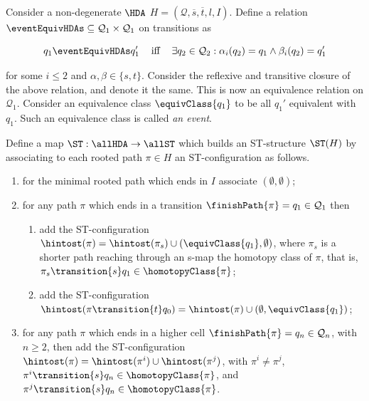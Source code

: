     \begin{definition}
        \label{def:HDA-to-ST-structure}
        Consider a non-degenerate $\HDA$ $H=(\mathcal{Q},\overline{s},\overline{t},l,I)$. Define a relation $\eventEquivHDAs\subseteq \mathcal{Q}_{1}\times \mathcal{Q}_{1}$ on transitions as 
    
        \[
            q_{1}\eventEquivHDAs q_{1}' \mbox{\hspace{2ex} iff \hspace{2ex}} \exists q_{2}\in \mathcal{Q}_{2}:\alpha_{i}(q_{2})=q_{1}\wedge \beta_{i}(q_{2})=q_{1}'
        \]

        for some $i\leq 2$ and $\alpha,\beta\in\{s,t\}$. Consider the reflexive and transitive closure of the above relation, and denote it the same. This is now an equivalence relation on $\mathcal{Q}_{1}$. Consider an equivalence class $\equivClass{q_{1}}$ to be all $q_{1}'$ equivalent with $q_{1}$. Such an equivalence class is called \emph{an event}.

        Define a map $\ST:\allHDA \rightarrow \allST$ which builds an ST-structure $\ST(H)$ by associating to each rooted path $\pi\in H$ an ST-configuration as follows.

        \begin{enumerate}
            \item\label{hintost_1} for the minimal rooted path which ends in $I$ associate $(\emptyset,\emptyset)$;
            \item\label{hintost_2} for any path $\pi$ which ends in a transition $\finishPath{\pi}=q_{1}\in \mathcal{Q}_{1}$ then 
        
            \begin{enumerate}
                \item\label{hintost_21} add the ST-configuration $\hintost(\pi)=\hintost(\pi_{s})\cup(\equivClass{q_{1}},\emptyset)$, where $\pi_{s}$ is a shorter path reaching through an s-map the homotopy class of $\pi$, that is, $\pi_{s}\transition{s}q_{1}\in\homotopyClass{\pi}$;
                \item\label{hintost_22} add the ST-configuration $\hintost(\pi\transition{t}q_{0})=\hintost(\pi)\cup(\emptyset,\equivClass{q_{1}})$;
            \end{enumerate}

            \item\label{hintost_3} for any path $\pi$ which ends in a higher cell $\finishPath{\pi}=q_{n}\in \mathcal{Q}_{n}$, with $n\geq 2$, then add the ST-configuration $\hintost(\pi)=\hintost(\pi^{i})\cup\hintost(\pi^{j})$, with $\pi^{i}\neq\pi^{j}$, $\pi^{i}\transition{s}q_{n}\in\homotopyClass{\pi}$, and $\pi^{j}\transition{s}q_{n}\in\homotopyClass{\pi}$.
        \end{enumerate}
    \end{definition}

